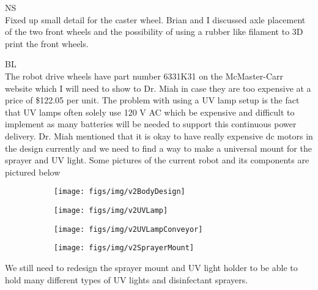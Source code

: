\documentclass[fontsize=11pt, %
                             paper=a4, %
                             twoside, %
                             captions=tableheading,
                             index=totoc,
                             hyperref]{labbook}
\begin{document}
\begin{addmargin}[0cm]{0cm}
NS\\
Fixed up small detail for the caster wheel. Brian and I discussed axle placement of the two front wheels and the possibility of using a rubber like filament to 3D print the front wheels.

BL\\
The robot drive wheels have part number 6331K31 on the McMaster-Carr website which I will need to show to Dr. Miah in case they are too expensive at a price of \$122.05 per unit. The problem with using a UV lamp setup is the fact that UV lamps often solely use 120 V AC which be expensive and difficult to implement as many batteries will be needed to support this continuous power delivery. Dr. Miah mentioned that it is okay to have really expensive dc motors in the design currently and we need to find a way to make a universal mount for the sprayer and UV light. Some pictures of the current robot and its components are pictured below
\begin{figure}[H]
\begin{subfigure}{.5\textwidth}
\centering
\texttt{[image: figs/img/v2BodyDesign]}
\end{subfigure}
\begin{subfigure}{.5\textwidth}
\centering
\texttt{[image: figs/img/v2UVLamp]}
\end{subfigure}
\begin{subfigure}{.5\textwidth}
\centering
\texttt{[image: figs/img/v2UVLampConveyor]}
\end{subfigure}
\begin{subfigure}{.5\textwidth}
\centering
\texttt{[image: figs/img/v2SprayerMount]}
\end{subfigure}
\end{figure}
We still need to redesign the sprayer mount and UV light holder to be able to hold many different types of UV lights and disinfectant sprayers.


\end{addmargin}
\end{document}
